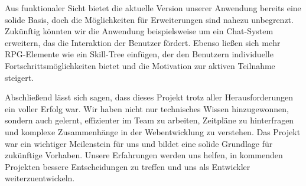 \documentclass[a4paper,12pt]{article}
\begin{document}
Aus funktionaler Sicht bietet die aktuelle Version unserer Anwendung bereits
eine solide Basis, doch die Möglichkeiten für Erweiterungen sind nahezu
unbegrenzt. Zukünftig könnten wir die Anwendung beispielsweise um ein
Chat-System erweitern, das die Interaktion der Benutzer fördert. Ebenso ließen
sich mehr RPG-Elemente wie ein Skill-Tree einfügen, der den Benutzern
individuelle Fortschrittsmöglichkeiten bietet und die Motivation zur aktiven
Teilnahme steigert.

Abschließend lässt sich sagen, dass dieses Projekt trotz aller
Herausforderungen ein voller Erfolg war. Wir haben nicht nur technisches Wissen
hinzugewonnen, sondern auch gelernt, effizienter im Team zu arbeiten, Zeitpläne
zu hinterfragen und komplexe Zusammenhänge in der Webentwicklung zu verstehen.
Das Projekt war ein wichtiger Meilenstein für uns und bildet eine solide
Grundlage für zukünftige Vorhaben. Unsere Erfahrungen werden uns helfen, in
kommenden Projekten bessere Entscheidungen zu treffen und uns als Entwickler
weiterzuentwickeln.

\newpage
\printbibliography
\end{document}
